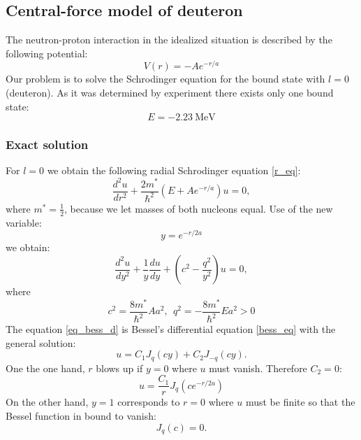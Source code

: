 \documentclass[a4paper, 14pt]{article}
\begin{document}
\subsection{Central-force model of deuteron}
The neutron-proton interaction in the idealized situation is described by the following potential:
$$V(r) = - A e^{-r/a}$$
Our problem is to solve the Schrodinger equation for the bound state with $l=0$ (deuteron). As it was determined by experiment there exists only one bound state:
\begin{equation}
    E = -2.23~\mathrm{MeV}
\end{equation}


\subsubsection{Exact solution}
For $l = 0$ we obtain the following radial Schrodinger equation \eqref{r_eq}:
\begin{equation}
    \frac{d^2 u}{d r^2} + \frac{2 m^*}{\hbar^2}(E+ A e^{-r/a})u = 0,
\end{equation}
where $m^* = \frac{1}{2}$, because we let masses of both nucleons equal. Use of the new variable:
\begin{equation}\label{abbr}
    y = e^{-r/2a}
\end{equation}
we obtain:
\begin{equation}\label{eq_bess_d}
    \frac{d^2 u}{d y^2} + \frac{1}{y}\frac{d u}{d y} + (c^2 - \frac{q^2}{y^2})u=0,
\end{equation}
where
\begin{equation}\label{abbr_2}
    c^2 = \frac{8 m^*}{\hbar^2}A a^2,~~q^2 = -\frac{8 m^*}{\hbar^2}E a^2 > 0
\end{equation}
The equation  \eqref{eq_bess_d} is Bessel's differential equation \eqref{bess_eq} with the general solution:
$$u = C_1 J_q(cy) + C_2 J_{-q} (cy).$$
One the one hand, $r$ blows up if $y = 0$ where $u$ must vanish. Therefore $C_2 = 0:$
\begin{equation}\label{ex_sol_deuteron}
    u = \frac{C_1}{r}J_q(c e^{-r/2a})
\end{equation}
On the other hand, $y = 1$ corresponds to $r = 0$ where $u$ must be finite so that the Bessel function in bound to vanish:
$$J_q(c) = 0.$$
\end{document}
